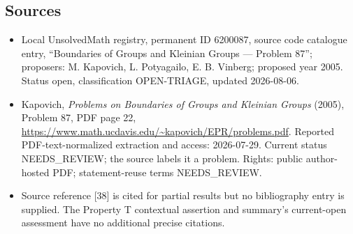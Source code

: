 \documentclass[11pt]{article}
\begin{document}
\subsection{Sources}
\begin{itemize}
\item Local UnsolvedMath registry, permanent ID 6200087, source code catalogue entry, ``Boundaries of Groups and Kleinian Groups --- Problem 87''; proposers: M. Kapovich, L. Potyagailo, E. B. Vinberg; proposed year 2005. Status open, classification OPEN-TRIAGE, updated 2026-08-06.
\item Kapovich, \emph{Problems on Boundaries of Groups and Kleinian Groups} (2005), Problem 87, PDF page 22, \url{https://www.math.ucdavis.edu/~kapovich/EPR/problems.pdf}. Reported PDF-text-normalized extraction and access: 2026-07-29. Current status NEEDS\_REVIEW; the source labels it a problem. Rights: public author-hosted PDF; statement-reuse terms NEEDS\_REVIEW.
\item Source reference [38] is cited for partial results but no bibliography entry is supplied. The Property T contextual assertion and summary's current-open assessment have no additional precise citations.
\end{itemize}
\end{document}
